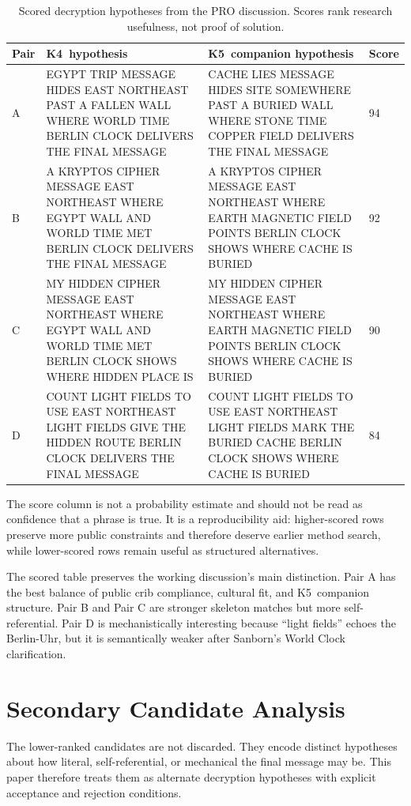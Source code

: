 \documentclass[12pt]{paperFormatting}
\newcommand{\Kfour}{K4}
\newcommand{\Kfive}{K5}
\begin{document}
\begin{thesisbody}
\begin{table}[H]
\caption{Scored decryption hypotheses from the PRO discussion. Scores rank research usefulness, not proof of solution.}
\label{tab:scoredHypotheses}
\centering
\tiny
\setlength{\tabcolsep}{2pt}
\begin{tabular}{C{0.08\textwidth}L{0.41\textwidth}L{0.41\textwidth}C{0.06\textwidth}}
\toprule
Pair & \Kfour\ hypothesis & \Kfive\ companion hypothesis & Score \\
\midrule
A &
EGYPT TRIP MESSAGE HIDES EAST NORTHEAST PAST A FALLEN WALL WHERE WORLD TIME BERLIN CLOCK DELIVERS THE FINAL MESSAGE &
CACHE LIES MESSAGE HIDES SITE SOMEWHERE PAST A BURIED WALL WHERE STONE TIME COPPER FIELD DELIVERS THE FINAL MESSAGE &
94 \\
B &
A KRYPTOS CIPHER MESSAGE EAST NORTHEAST WHERE EGYPT WALL AND WORLD TIME MET BERLIN CLOCK DELIVERS THE FINAL MESSAGE &
A KRYPTOS CIPHER MESSAGE EAST NORTHEAST WHERE EARTH MAGNETIC FIELD POINTS BERLIN CLOCK SHOWS WHERE CACHE IS BURIED &
92 \\
C &
MY HIDDEN CIPHER MESSAGE EAST NORTHEAST WHERE EGYPT WALL AND WORLD TIME MET BERLIN CLOCK SHOWS WHERE HIDDEN PLACE IS &
MY HIDDEN CIPHER MESSAGE EAST NORTHEAST WHERE EARTH MAGNETIC FIELD POINTS BERLIN CLOCK SHOWS WHERE CACHE IS BURIED &
90 \\
D &
COUNT LIGHT FIELDS TO USE EAST NORTHEAST LIGHT FIELDS GIVE THE HIDDEN ROUTE BERLIN CLOCK DELIVERS THE FINAL MESSAGE &
COUNT LIGHT FIELDS TO USE EAST NORTHEAST LIGHT FIELDS MARK THE BURIED CACHE BERLIN CLOCK SHOWS WHERE CACHE IS BURIED &
84 \\
\bottomrule
\end{tabular}
\end{table}

The score column is not a probability estimate and should not be read as confidence that a phrase is true. It is a reproducibility aid: higher-scored rows preserve more public constraints and therefore deserve earlier method search, while lower-scored rows remain useful as structured alternatives.

The scored table preserves the working discussion's main distinction. Pair A has the best balance of public crib compliance, cultural fit, and \Kfive\ companion structure. Pair B and Pair C are stronger skeleton matches but more self-referential. Pair D is mechanistically interesting because ``light fields'' echoes the Berlin-Uhr, but it is semantically weaker after Sanborn's World Clock clarification.

\section{Secondary Candidate Analysis}
The lower-ranked candidates are not discarded. They encode distinct hypotheses about how literal, self-referential, or mechanical the final message may be. This paper therefore treats them as alternate decryption hypotheses with explicit acceptance and rejection conditions.


\end{thesisbody}
\end{document}
